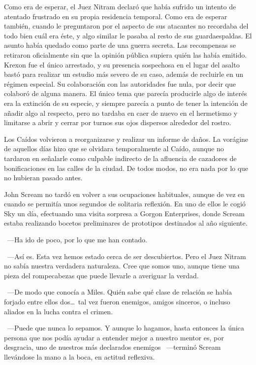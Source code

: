 \parbreak
Como era de esperar, el Juez Nitram declaró que había sufrido un intento de atentado frustrado en su propia residencia temporal. Como era de esperar también, cuando le preguntaron por el aspecto de sus atacantes no recordaba del todo bien cuál era éste, y algo similar le pasaba al resto de sus guardaespaldas. El asunto había quedado como parte de una guerra secreta. Las recompensas se retiraron oficialmente sin que la opinión pública supiera quién las había emitido. Krexon fue el único arrestado, y su presencia sospechosa en el lugar del asalto bastó para realizar un estudio más severo de su caso, además de recluirle en un régimen especial. Su colaboración con las autoridades fue nula, por decir que colaboró de alguna manera. El único tema que parecía producirle algo de interés era la extinción de su especie, y siempre parecía a punto de tener la intención de añadir algo al respecto, pero no tardaba en caer de nuevo en el hermetismo y limitarse a abrir y cerrar por turnos sus ojos dispersos alrededor del rostro.

Los Caídos volvieron a reorganizarse y realizar un informe de daños. La vorágine de aquellos días hizo que se olvidara temporalmente al Caído, aunque no tardaron en señalarle como culpable indirecto de la afluencia de cazadores de bonificaciones en las calles de la ciudad. De todos modos, no era nada por lo que no hubieran pasado antes.

John Scream no tardó en volver a sus ocupaciones habituales, aunque de vez en cuando se permitía unos segundos de solitaria reflexión. En uno de ellos le cogió Sky un día, efectuando una visita sorpresa a Gorgon Enterprises, donde Scream estaba realizando bocetos preliminares de prototipos destinados al año siguiente.

~---Ha ido de poco, por lo que me han contado.

~---Así es. Esta vez hemos estado cerca de ser descubiertos. Pero el Juez Nitram no sabía nuestra verdadera naturaleza. Cree que somos uno, aunque tiene una pieza del rompecabezas que puede llevarle a averiguar la verdad.

~---De modo que conocía a Miles. Quién sabe qué clase de relación se había forjado entre ellos dos\dots\ tal vez fueron enemigos, amigos sinceros, o incluso aliados en la lucha contra el crimen.

~---Puede que nunca lo sepamos. Y aunque lo hagamos, hasta entonces la única persona que nos podía ayudar a entender mejor a nuestro mentor es, por desgracia, uno de nuestros más declarados enemigos ~---terminó Scream llevándose la mano a la boca, en actitud reflexiva.

\endinput

